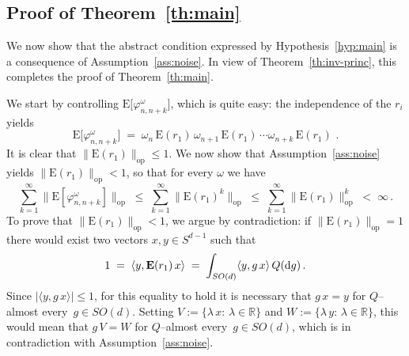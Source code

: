 \documentclass[a4paper,reqno,11pt]{amsart}
\numberwithin{equation}{section}
\newcommand{\gl}{\lambda}
\newcommand{\go}{\omega}
\newcommand{\dd}{\text{\rm d}}             %
\newcommand{\R}{\mathbb{R}}
\def\bE{\ensuremath{\bs{\mathrm{E}}}}
\def\bs{\boldsymbol}
\renewcommand{\phi}{\varphi}
\begin{document}

\smallskip

\subsection{Proof of Theorem~\ref{th:main}}

\label{sec:validity}

We now show that the abstract condition expressed by Hypothesis~\ref{hyp:main}
is a consequence of Assumption~\ref{ass:noise}. In view of Theorem~\ref{th:inv-princ},
this completes the proof of Theorem~\ref{th:main}.

\smallskip

We start by controlling $\bE \big[ \phi^\go_{n,n+k} \big]$, which is quite easy:
the independence of the $r_i$ yields
\begin{equation} \label{eq:val1}
	\bE \big[ \phi^\go_{n,n+k} \big] \;=\;
	\go_n \, \bE(r_1) \, \go_{n+1} \, \bE(r_1) \, \cdots
	\go_{n+k} \, \bE(r_1)\,\,.
\end{equation}
It is clear that $\| \bE(r_1) \|_{\text{op}} \le 1$.
We now show that Assumption~\ref{ass:noise} yields $\| \bE(r_1) \|_{\text{op}} < 1$,
so that for every $\go$ we have
\begin{equation} \label{eq:analogy}
	\sum_{k=1}^\infty \big\| \bE [\phi^\go_{n,n+k}] \big\|_{\text{op}}
	\;\le\; \sum_{k=1}^\infty \big\| \bE(r_1)^k \big\|_{\text{op}}
	\;\le\; \sum_{k=1}^\infty \| \bE(r_1)\|_{\text{op}}^k \;<\; \infty \,.
\end{equation}
To prove that $\| \bE(r_1) \|_{\text{op}} < 1$, we argue by contradiction:
if $\| \bE(r_1) \|_{\text{op}} = 1$ there would exist two vectors
$x,y \in S^{d-1}$ such that
\begin{equation}
	1 \;=\; \langle y, \bE(r_1) \, x \rangle \;=\; \int_{SO(d)} \langle y, g \, x \rangle
	\, Q(\dd g) \,.
\end{equation}
Since $|\langle y, g \, x \rangle | \le 1$, for this equality to hold it is
necessary that $g \, x = y$ for $Q$--almost every~$g \in SO(d)$.
Setting $V := \{\gl\, x:\, \gl \in \R\}$ and $W := \{\gl\, y: \, \gl \in \R\}$,
this would mean that $g \, V = W$ for $Q$--almost every~$g \in SO(d)$, which is
in contradiction with Assumption~\ref{ass:noise}.

\smallskip
\end{document}
